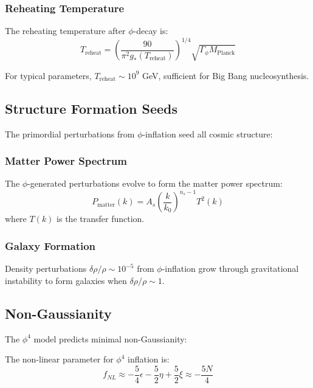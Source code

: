 \subsubsection{Reheating Temperature}

\begin{theorem}
The reheating temperature after $\phi$-decay is:
\begin{equation}
T_{\text{reheat}} = \left(\frac{90}{\pi^2 g_*(T_{\text{reheat}})}\right)^{1/4} \sqrt{\Gamma_\phi M_{\text{Planck}}}
\label{eq:phi_reheat_temperature}
\end{equation}
\end{theorem}

For typical parameters, $T_{\text{reheat}} \sim 10^{9}$ GeV, sufficient for Big Bang nucleosynthesis.

\subsection{Structure Formation Seeds}

The primordial perturbations from $\phi$-inflation seed all cosmic structure:

\subsubsection{Matter Power Spectrum}

The $\phi$-generated perturbations evolve to form the matter power spectrum:
\begin{equation}
P_{\text{matter}}(k) = A_s \left(\frac{k}{k_0}\right)^{n_s-1} T^2(k)
\end{equation}
where $T(k)$ is the transfer function.

\subsubsection{Galaxy Formation}

Density perturbations $\delta \rho/\rho \sim 10^{-5}$ from $\phi$-inflation grow through gravitational instability to form galaxies when $\delta \rho/\rho \sim 1$.

\subsection{Non-Gaussianity}

The $\phi^4$ model predicts minimal non-Gaussianity:

\begin{theorem}
The non-linear parameter for $\phi^4$ inflation is:
\begin{equation}
f_{NL} \approx -\frac{5}{4}\epsilon - \frac{5}{2}\eta + \frac{5}{2}\xi \approx -\frac{5N}{4}
\label{eq:phi_non_gaussianity}
\end{equation}
\end{theorem}

